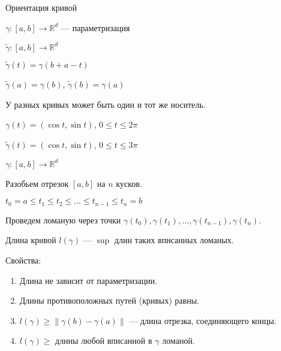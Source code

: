    \begin{Def}
    
        Ориентация кривой

        $\gamma \colon [a, b] \rightarrow \mathbb{R}^d$ --- параметризация

        $\widetilde{\gamma} \colon [a, b] \rightarrow \mathbb{R}^d$

        $\widetilde{\gamma}(t) = \gamma(b + a - t)$

        $\widetilde{\gamma}(a) = \gamma(b)$, $\widetilde{\gamma}(b) = \gamma(a)$
    
    \end{Def}

    \begin{Rem}
   
        У разных кривых может быть один и тот же носитель.
    
        $\gamma(t) = (\cos t, \sin t)$, $0 \le t \le 2\pi$

        $\widetilde{\gamma}(t) = (\cos t, \sin t)$, $0 \le t \le 3\pi$

    \end{Rem}

    \begin{Def}
    
        $\gamma \colon [a, b] \rightarrow \mathbb{R}^d$

        Разобьем отрезок $[a, b]$ на $n$ кусков.

        $t_0 = a \le t_1 \le t_2 \le \dots \le t_{n-1} \le t_n = b$

        Проведем ломаную через точки $\gamma(t_0), \gamma(t_1), \dots, \gamma(t_{n-1}), \gamma(t_n)$.
        
        Длина кривой $l(\gamma)$ --- $\sup$ длин таких вписанных ломаных.
    
    \end{Def}

    Свойства:
    
    \begin{enumerate}
    
        \item Длина не зависит от параметризации.

        \item Длины противоположных путей (кривых) равны.

        \item $l(\gamma) \ge \|\gamma(b) - \gamma(a)\|$ --- длина отрезка, соединяющего концы.

        \item $l(\gamma) \ge$ длины любой вписанной в $\gamma$ ломаной.
    
    \end{enumerate}

